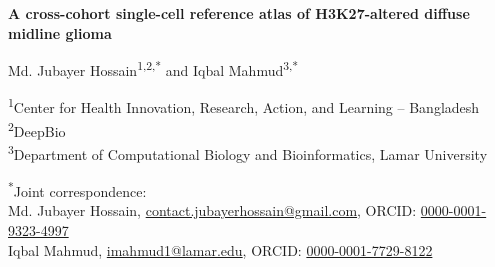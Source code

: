 \documentclass[11pt,a4paper]{article}
\begin{document}
\begin{flushleft}
{\LARGE\bfseries\linespread{1.1}\selectfont A cross-cohort single-cell reference atlas of H3K27-altered diffuse midline glioma\par}
\vspace{14pt}
{\large Md. Jubayer Hossain\textsuperscript{1,2,*} and Iqbal Mahmud\textsuperscript{3,*}\par}
\vspace{8pt}
{\small
\textsuperscript{1}Center for Health Innovation, Research, Action, and Learning -- Bangladesh\\
\textsuperscript{2}DeepBio\\
\textsuperscript{3}Department of Computational Biology and Bioinformatics, Lamar University\par}
\vspace{8pt}
{\small \textsuperscript{*}Joint correspondence:\\
Md. Jubayer Hossain, \href{mailto:contact.jubayerhossain@gmail.com}{contact.jubayerhossain@gmail.com}, ORCID: \href{https://orcid.org/0000-0001-9323-4997}{0000-0001-9323-4997}\\
Iqbal Mahmud, \href{mailto:imahmud1@lamar.edu}{imahmud1@lamar.edu}, ORCID: \href{https://orcid.org/0000-0001-7729-8122}{0000-0001-7729-8122}\par}
\end{flushleft}
\vspace{6pt}

\end{document}
